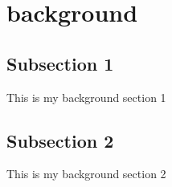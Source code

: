 \section{background}

\subsection{Subsection 1}

This is my background section 1

\subsection{Subsection 2}

This is my background section 2
